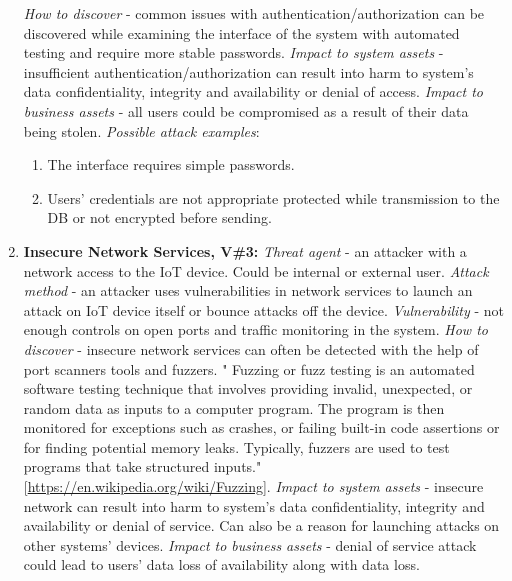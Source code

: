 \documentclass[12pt]{article}
\begin{document}
\begin{enumerate}
		\newline \textit{How to discover} - common issues with authentication/authorization can be discovered while examining the interface of the system with automated testing and require more stable passwords.
		\newline \textit{Impact to system assets} - insufficient authentication/authorization can result into harm to system’s data confidentiality, integrity and availability or denial of access.
		\newline \textit{Impact to business assets} - all users could be compromised as a result of their data being stolen.
		\newline \textit{Possible attack examples}:
			\begin{enumerate}[label=(\roman*)]
				\item The interface requires simple passwords.
				\item Users’ credentials are not appropriate protected while transmission to the DB or not encrypted before sending.
			\end{enumerate}
	\item \textbf{Insecure Network Services, V\#3:}
		\newline \textit{Threat agent} - an attacker with a network access to the IoT device. Could be internal or external user.
		\newline \textit{Attack method} - an attacker uses vulnerabilities in network services to launch an attack on IoT device itself or bounce attacks off the device.
		\newline \textit{Vulnerability} - not enough controls on open ports and traffic monitoring in the system.
		\newline \textit{How to discover} - insecure network services can often be detected with the help of port scanners tools and fuzzers. " Fuzzing or fuzz testing is an automated software testing technique that involves providing invalid, unexpected, or random data as inputs to a computer program. The program is then monitored for exceptions such as crashes, or failing built-in code assertions or for finding potential memory leaks. Typically, fuzzers are used to test programs that take structured inputs." [\url{https://en.wikipedia.org/wiki/Fuzzing}].
		\newline \textit{Impact to system assets} - insecure network can result into harm to system’s data confidentiality, integrity and availability or denial of service. Can also be a reason for launching attacks on other systems’ devices.
		\newline \textit{Impact to business assets} - denial of service attack could lead to users’ data loss of availability along with data loss.

\end{enumerate}
\end{document}
